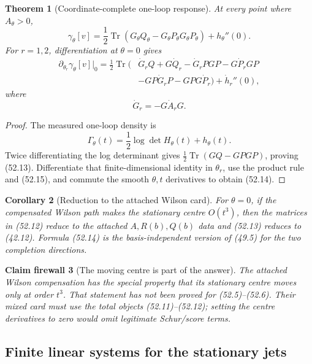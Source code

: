 \documentclass[11pt,oneside]{book}
\newtheorem{theorem}{Theorem}[chapter]
\newtheorem{corollary}[theorem]{Corollary}
\newtheorem{firewall}[theorem]{Claim firewall}
\theoremstyle{definition}
\theoremstyle{remark}
\newcommand{\Tr}{\operatorname{Tr}}
\begin{document}
\begin{theorem}[Coordinate-complete one-loop response]
\label{thm:e8v52-coordinate-complete-response}
At every point where \(A_\theta>0\),
\[
\boxed{
 \gamma_\theta[v]
 =\frac12\Tr\!\left(
 G_\theta Q_\theta-G_\theta P_\theta G_\theta P_\theta
 \right)+h_\theta''(0).}                                     \tag{52.13}
\]
For \(r=1,2\), differentiation at \(\theta=0\) gives
\[
\boxed{\begin{split}
 \partial_{\theta_r}\gamma_\theta[v]\big|_0
 =\frac12\Tr\bigl(&
 \dot G_r Q+G\dot Q_r
 -\dot G_rPGP-G\dot P_rGP\\
 &-GP\dot G_rP-GPG\dot P_r\bigr)
 +\dot h_r''(0),
\end{split}}                                                  \tag{52.14}
\]
where
\[
 \dot G_r=-G\dot A_rG.                                       \tag{52.15}
\]
\end{theorem}

\begin{proof}
The measured one-loop density is
\[
 \Gamma_\theta(t)
 =\frac12\log\det H_\theta(t)+h_\theta(t).
\]
Twice differentiating the log determinant gives
\(\frac12\Tr(GQ-GPGP)\), proving (52.13).
Differentiate that finite-dimensional identity in \(\theta_r\),
use the product rule and (52.15), and commute the smooth
\(\theta,t\) derivatives to obtain (52.14).
\end{proof}

\begin{corollary}[Reduction to the attached Wilson card]
\label{cor:e8v52-Wilson-reduction}
For \(\theta=0\), if the compensated Wilson path makes the
stationary centre \(O(t^3)\), then the matrices in (52.12) reduce
to the attached \(A,R(b),Q(b)\) data and (52.13) reduces to
(42.12).  Formula (52.14) is the basis-independent version of
(49.5) for the two completion directions.
\end{corollary}

\begin{firewall}[The moving centre is part of the answer]
\label{fire:e8v52-moving-centre}
The attached Wilson compensation has the special property that its
stationary centre moves only at order \(t^3\).  That statement has
not been proved for (52.5)--(52.6).  Their mixed card must use the
total objects (52.11)--(52.12); setting the centre derivatives to
zero would omit legitimate Schur/score terms.
\end{firewall}

\subsection{Finite linear systems for the stationary jets}
\end{document}
